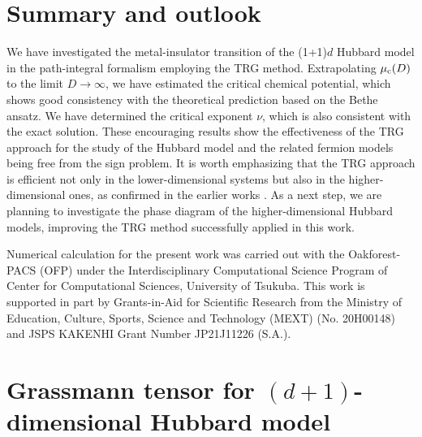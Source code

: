 \documentclass[nofootinbib,prd,aps,superscriptaddress,preprintnumbers,twocolumn,showpacs]{revtex4-1}
\begin{document}
\section{Summary and outlook} 
\label{sec:summary}

We have investigated the metal-insulator transition of the (1+1)$d$ Hubbard model in the path-integral formalism employing the TRG method. Extrapolating $\mu_{\rm c}(D)$ to the limit $D\to\infty$, we have estimated the critical chemical potential, which shows good consistency with the theoretical prediction based on the Bethe ansatz. We have determined the critical exponent $\nu$, which is also consistent with the exact solution. These encouraging results show the effectiveness of the TRG approach for the study of the Hubbard model and the related fermion models being free from the sign problem. It is worth emphasizing that the TRG approach is efficient not only in the lower-dimensional systems but also in the higher-dimensional ones, as confirmed in the earlier works \cite{PhysRevB.86.045139,Wang_2014,Sakai:2017jwp,Yoshimura:2017jpk,Kuramashi:2018mmi,Akiyama:2019xzy,Adachi:2019paf,Kadoh:2019kqk,Akiyama:2020ntf,Akiyama:2020soe,Akiyama:2021zhf}. As a next step, we are planning to investigate the phase diagram of the higher-dimensional Hubbard models, improving the TRG method successfully applied in this work.

\begin{acknowledgments}
Numerical calculation for the present work was carried out with the Oakforest-PACS (OFP) under the Interdisciplinary Computational Science Program of Center for Computational Sciences, University of Tsukuba. This work is supported in part by Grants-in-Aid for Scientific Research from the Ministry of Education, Culture, Sports, Science and Technology (MEXT) (No. 20H00148) and JSPS KAKENHI Grant Number JP21J11226 (S.A.).
\end{acknowledgments}


\appendix

\section{Grassmann tensor for $(d+1)$-dimensional Hubbard model}
\label{app:gtensor}
\end{document}

